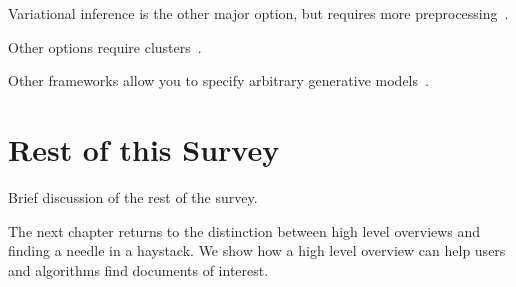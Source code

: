 Variational inference is the other major option, but requires more
preprocessing~\citep{blei-03,vw}.

Other options require clusters~\citep{Narayanamurthy-11,zhai-12}.

Other frameworks allow you to specify arbitrary generative
models~\citep{stan-software:2014}.

\section{Rest of this Survey}

Brief discussion of the rest of the survey.

The next chapter returns to the distinction between high level
overviews and finding a needle in a haystack.  We show how a high
level overview can help users and algorithms find documents of
interest.